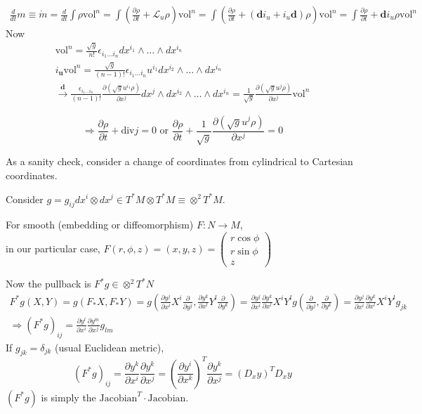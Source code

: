 \documentclass[twoside,landscape,10pt]{amsart}
\theoremstyle{plain}
\theoremstyle{definition}
\theoremstyle{remark}
\theoremstyle{remark}
\begin{document}
\begin{multicols*}{2}
\[
\begin{gathered}
  \frac{d}{dt} m \equiv \dot{m} = \frac{d}{dt} \int \rho \text{vol}^n = \int \left( \frac{ \partial \rho}{ \partial t} + \mathcal{L}_u \rho \right)\text{vol}^n = \int \left( \frac{ \partial \rho }{ \partial t} + (\mathbf{d}i_u + i_u \mathbf{d})\rho \right)\text{vol}^n = \int \frac{ \partial \rho }{ \partial t} + \mathbf{d}i_u \rho \text{vol}^n 
\end{gathered}
\]
Now
\[
\begin{gathered}
  \text{vol}^n = \frac{ \sqrt{g}}{n!} \epsilon_{i_1 \dots i_n} dx^{i_1} \wedge \dots \wedge dx^{i_n} \\ 
  i_{\mathbf{u}} \text{vol}^n = \frac{ \sqrt{g}}{(n-1)!} \epsilon_{i_1 \dots i_n} u^{i_1} dx^{i_2} \wedge \dots \wedge dx^{i_n} \\
  \xrightarrow{ \mathbf{d}} \frac{ \epsilon_{i_1 \dots i_n}}{ (n-1)!} \frac{ \partial (\sqrt{g} u^{i_1} \rho ) }{ \partial x^j} dx^j \wedge dx^{i_2} \wedge \dots \wedge dx^{i_n} = \frac{1}{\sqrt{g}} \frac{ \partial ( \sqrt{g} u^j \rho ) }{ \partial x^j} \text{vol}^n 
\end{gathered}
\]

\[
\Longrightarrow \frac{ \partial \rho }{ \partial t} + \text{div} j = 0 \text{ or } \frac{ \partial \rho}{ \partial t} + \frac{1}{\sqrt{g}} \frac{ \partial ( \sqrt{g} u^j \rho ) }{ \partial x^j} = 0 
\]

As a sanity check, consider a change of coordinates from cylindrical to Cartesian coordinates.  

Consider $g=  g_{ij} dx^i \otimes dx^j \in T^*M \otimes T^*M \equiv \otimes^2 T^*M$.  

For smooth (embedding or diffeomorphism) $F : N\to M$, \\
in our particular case, $F(r,\phi,z) = (x,y,z) = \left( \begin{matrix} r\cos{\phi } \\ r\sin{\phi} \\ z \end{matrix} \right)$

Now the pullback is $F^*g \in \otimes^2T^*N$
\[
\begin{gathered}
  F^* g(X,Y) = g(F_*X, F_*Y) = g\left( \frac{ \partial y^j}{ \partial x^i }X^i \frac{ \partial }{ \partial y^j}, \frac{ \partial y^k}{ \partial x^l} Y^l \frac{ \partial }{ \partial y^k} \right) = \frac{ \partial y^j}{ \partial x^i} \frac{ \partial y^k}{\partial x^l} X^i Y^l g\left( \frac{ \partial }{ \partial y^j}, \frac{ \partial }{ \partial y^k } \right) = \frac{ \partial y^j}{ \partial x^i} \frac{ \partial y^k}{ \partial x^l} X^i Y^l g_{jk} \\
\Longrightarrow  (F^*g)_{ij} = \frac{ \partial y^l}{ \partial x^i} \frac{ \partial y^m}{ \partial x^j} g_{lm}
\end{gathered}
\]
If $g_{jk} = \delta_{jk}$ (usual Euclidean metric),
\[
(F^*g)_{ij} = \frac{ \partial y^k}{ \partial x^i } \frac{ \partial y^k}{ \partial x^j} = \left( \frac{ \partial y^i}{ \partial x^k}\right)^T \frac{ \partial y^k}{ \partial x^j} = (D_xy)^T D_xy
\]
$(F^*g)$ is simply the $\text{Jacobian}^T\cdot \text{Jacobian}$.  


\end{multicols*}
\end{document}
